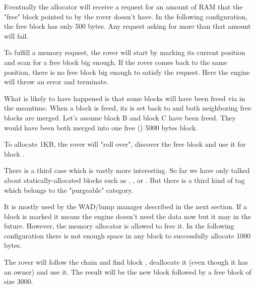Eventually the allocator will receive a request for an amount of RAM that the "free" block pointed to by the rover doesn't have. In the following configuration, the free block has only 500 bytes. Any request asking for more than that amount will fail.\\
\par
{}
\par
To fulfill a memory request, the rover will start by marking its current position and scan for a free block big enough. If the rover comes back to the same position, there is no free block big enough to satisfy the request. Here the engine will throw an error and terminate.\\
\par
What is likely to have happened is that some blocks will have been freed via  in the meantime. When a block is freed, its  is set back to  and both neighboring free blocks are merged. Let's assume block B and block C have been freed. They would have been both merged into one free () 5000 bytes block.\\
\par
{}
\par
To allocate 1KB, the rover will "roll over", discover the free block and use it for block .\\
\par
{}
\par
There is a third case which is vastly more interesting. So far we have only talked about statically-allocated blocks such as , , or . But there is a third kind of tag which belongs to the "purgeable" category.\\
\par
 It is mostly used by the WAD/lump manager described in the next section. If a block is marked  it means the engine doesn't need the data now but it may in the future. However, the memory allocator is allowed to free it. In the following configuration there is not enough space in any block to successfully allocate 1000 bytes.\\
\par
{}
\par
The rover will follow the chain and find block , deallocate it (even though it has an owner) and use it. The result will be the new block  followed by a free block of size 3000.\\
\par
